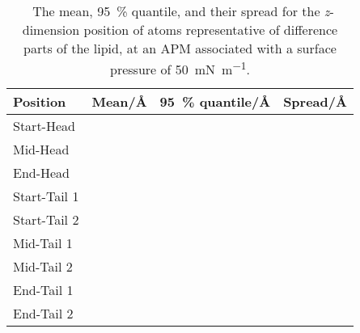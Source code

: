 %
%
\begin{table}
\centering
\small
  \caption{\ The mean, \SI{95}{\percent} quantile, and their spread for the \emph{z}-dimension position of atoms representative of difference parts of the lipid, at an APM associated with a surface pressure of \SI{50}{\milli\newton\per\meter}.}
  \label{tab:spread4}
  \begin{tabular}{llll}
    \hline
    Position & Mean/\si{\angstrom} & \SI{95}{\percent} quantile/\si{\angstrom} & Spread/\si{\angstrom} \\
    \hline
    Start-Head &  &  &  \\
    Mid-Head &  &  &  \\
    End-Head &  &  &  \\
    \hline
    Start-Tail 1 &  &  &  \\
    Start-Tail 2 &  &  &  \\
    Mid-Tail 1 &  &  &  \\
    Mid-Tail 2 &  &  &  \\
    End-Tail 1 &  &  &  \\
    End-Tail 2 &  &  &  \\
    \hline
  \end{tabular}
\end{table}
%
